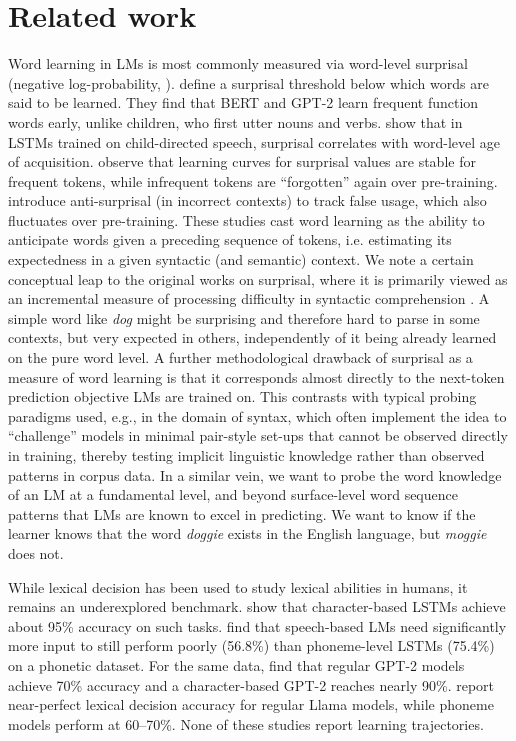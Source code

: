 \section{Related work}
Word learning in LMs is most commonly measured via word-level surprisal (negative log-probability, \citealp{hale2001probabilistic}). \citet{chang2022word} define a surprisal threshold below which words are said to be learned. They find that BERT and GPT-2 learn frequent function words early, unlike children, who first utter nouns and verbs. \citet{portelance2023predicting} show that in LSTMs trained on child-directed speech, surprisal correlates with word-level age of acquisition. \citet{chang2024characterizing} observe that learning curves for surprisal values are stable for frequent tokens, while infrequent tokens are ``forgotten'' again over pre-training. \citet{shafiabadi2025surprisal} introduce anti-surprisal (in incorrect contexts) to track false usage, which also fluctuates over pre-training. These studies cast word learning as the ability to anticipate words given a preceding sequence of tokens, i.e. estimating its expectedness in a given syntactic (and semantic) context. We note a certain conceptual leap to the original works on surprisal, where it is primarily viewed as an incremental measure of processing difficulty in syntactic comprehension \cite{levy2008expectationbased, demberg2009computational}. A simple word like \textit{dog} might be surprising and therefore hard to parse in some contexts, but very expected in others, independently of it being already learned on the pure word level. A further methodological drawback of surprisal as a measure of word learning is that it corresponds almost directly to the next-token prediction objective LMs are trained on. This contrasts with typical probing paradigms used, e.g., in the domain of syntax, which often implement the idea to ``challenge'' models in minimal pair-style set-ups that cannot be observed directly in training, thereby testing implicit linguistic knowledge rather than observed patterns in corpus data. In a similar vein, we want to probe the word knowledge of an LM at a fundamental level, and beyond surface-level word sequence patterns that LMs are known to excel in predicting. We want to know if the learner knows that the word \textit{doggie} exists in the English language, but \textit{moggie} does not.

While lexical decision has been used to study lexical abilities in humans, it remains an underexplored benchmark. \citet{legodais2017comparing} show that character-based LSTMs achieve about 95\% accuracy on such tasks. \citet{lavechin2023babyslm} find that speech-based LMs need significantly more input to still perform poorly (56.8\%) than phoneme-level LSTMs (75.4\%) on a phonetic dataset. For the same data,  \citet{goriely2024babble} find that regular GPT-2 models achieve 70\% accuracy and a character-based GPT-2 reaches nearly 90\%. \citet{bunzeck2025small} report near-perfect lexical decision accuracy for regular Llama models, while phoneme models perform at 60--70\%. None of these studies report learning trajectories.